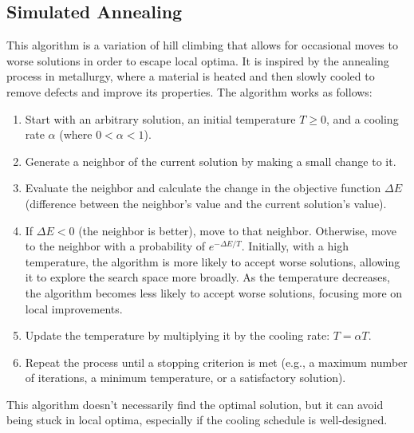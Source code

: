 \subsection{Simulated Annealing}
This algorithm is a variation of hill climbing that allows for occasional moves to worse solutions in order to escape local optima. It is inspired by the annealing process in metallurgy, where a material is heated and then slowly cooled to remove defects and improve its properties. The algorithm works as follows:
\begin{enumerate}
    \item Start with an arbitrary solution, an initial temperature $T\geq 0$, and a cooling rate $\alpha$ (where $0 < \alpha < 1$).
    \item Generate a neighbor of the current solution by making a small change to it.
    \item Evaluate the neighbor and calculate the change in the objective function $\Delta E$ (difference between the neighbor's value and the current solution's value).
    \item If $\Delta E < 0$ (the neighbor is better), move to that neighbor. Otherwise, move to the neighbor with a probability of $e^{-\Delta E / T}$. Initially, with a high temperature, the algorithm is more likely to accept worse solutions, allowing it to explore the search space more broadly. As the temperature decreases, the algorithm becomes less likely to accept worse solutions, focusing more on local improvements.
    \item Update the temperature by multiplying it by the cooling rate: $T = \alpha T$.
    \item Repeat the process until a stopping criterion is met (e.g., a maximum number of iterations, a minimum temperature, or a satisfactory solution).
\end{enumerate}

This algorithm doesn't necessarily find the optimal solution, but it can avoid being stuck in local optima, especially if the cooling schedule is well-designed.



